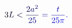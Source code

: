 \documentclass[12pt]{article}
\begin{document}
\makeatletter
\renewcommand*{\@textcolor}[3]{%
  \protect\leavevmode
  \begingroup
    \color#1{#2}#3%
  \endgroup
}
\makeatother
\begin{displaymath}
\mathcolor[RGB]{0,0,15}{3} \mathcolor[RGB]{0,0,30}{L} \mathcolor[RGB]{0,0,45}{<} \mathcolor[RGB]{0,0,60}{\frac { \mathcolor[RGB]{0,0,75}{2} \mathcolor[RGB]{0,0,90}{a} ^ { \mathcolor[RGB]{0,0,105}{2} } } { \mathcolor[RGB]{0,0,120}{2} \mathcolor[RGB]{0,0,135}{5} } } \mathcolor[RGB]{0,0,150}{=} \mathcolor[RGB]{0,0,165}{\frac { \mathcolor[RGB]{0,0,180}{t} } { \mathcolor[RGB]{0,0,195}{2} \mathcolor[RGB]{0,0,210}{5} \mathcolor[RGB]{0,0,225}{\pi} } } \mathcolor[RGB]{0,0,240}{.}
\end{displaymath}
\end{document}
